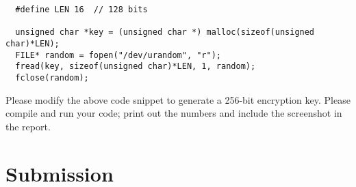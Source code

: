 \begin{lstlisting}
  #define LEN 16  // 128 bits

  unsigned char *key = (unsigned char *) malloc(sizeof(unsigned char)*LEN);
  FILE* random = fopen("/dev/urandom", "r");
  fread(key, sizeof(unsigned char)*LEN, 1, random);
  fclose(random);
\end{lstlisting}


Please modify the above code snippet to generate a 256-bit encryption key. Please 
compile and run your code; print out the numbers and 
include the screenshot in the report. 




\section{Submission}

\seedsubmission




